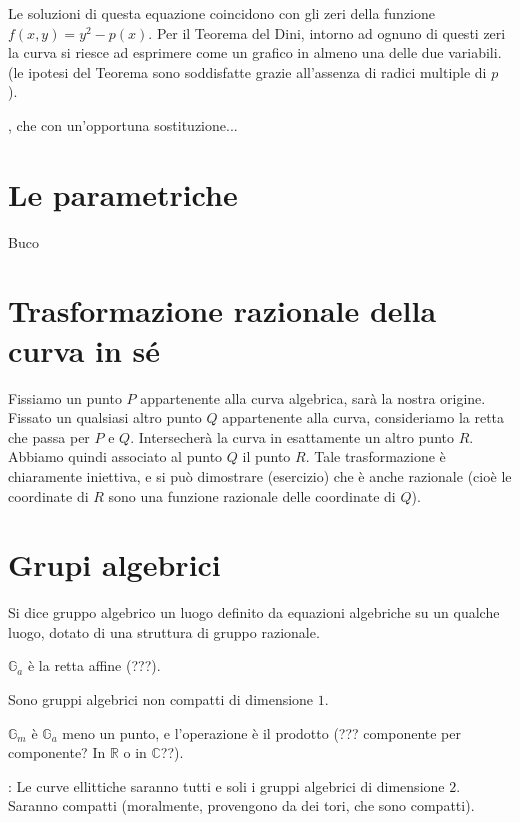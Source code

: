 Le soluzioni di questa equazione coincidono con 
gli zeri della funzione $f \left( x,y \right) = y^2 - p \left( x \right)$.
Per il Teorema del Dini, intorno ad ognuno di questi zeri la curva si riesce ad esprimere come un grafico in almeno una delle due variabili.
(le ipotesi del Teorema sono soddisfatte grazie all'assenza di radici multiple di $p$ ).

, che con un'opportuna sostituzione...

\section{Le parametriche}
Buco

\section{Trasformazione razionale della curva in sé}
Fissiamo un punto $P$ appartenente alla curva algebrica, sarà la nostra origine. Fissato un qualsiasi altro punto $Q$
appartenente alla curva, consideriamo la retta che passa per $P$ e $Q$. Intersecherà la curva in esattamente un altro punto $R$.
Abbiamo quindi associato al punto $Q$ il punto $R$. Tale trasformazione è chiaramente iniettiva, e si può dimostrare (esercizio)
che è anche razionale (cioè le coordinate di $R$ sono una funzione razionale delle coordinate di $Q$).

\section{Grupi algebrici}
\begin{definizione}
Si dice gruppo algebrico un luogo definito da equazioni algebriche 
su un qualche luogo, dotato di una struttura di gruppo razionale.
\end{definizione}

\begin{definizione}
$\mathbb{G}_a$ è la retta affine (???).
\end{definizione}

\begin{osservazione}
Sono gruppi algebrici non compatti di dimensione $1$.
\end{osservazione}

\begin{definizione}
$\mathbb{G}_m$ è $\mathbb{G}_a$ meno un punto, e l'operazione è il prodotto (??? componente per componente?
In $\mathbb{R}$ o in $\mathbb{C}$??).
\end{definizione}


:
Le curve ellittiche saranno tutti e soli i gruppi algebrici di dimensione $2$. Saranno compatti
(moralmente, provengono da dei tori, che sono compatti).


